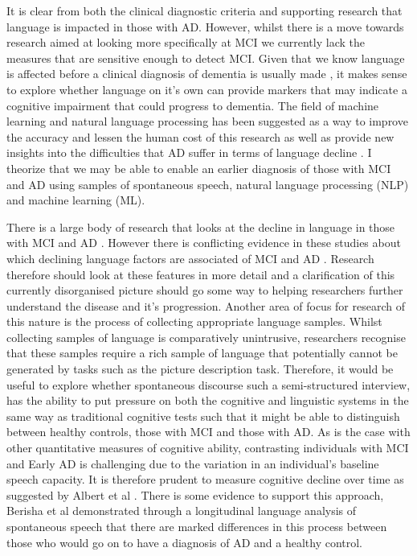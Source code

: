 \par
It is clear from both the clinical diagnostic criteria and supporting research that language is impacted in those with AD. However, whilst there is a move towards research aimed at looking more specifically at MCI we currently lack the measures that are sensitive enough to detect MCI. Given that we know language is affected before a clinical diagnosis of dementia is usually made \cite{Berisha2015, Snowdon1996, Le2011}, it makes sense to explore whether language on it's own can provide markers that may indicate a cognitive impairment that could progress to dementia. The field of machine learning and natural language processing has been suggested as a way to improve the accuracy and lessen the human cost of this research as well as provide new insights into the difficulties that AD suffer in terms of language decline \cite{Boschi2017}. I theorize that we may be able to enable an earlier diagnosis of those with MCI and AD using samples of spontaneous speech, natural language processing (NLP) and machine learning (ML).
\par
There is a large body of research that looks at the decline in language in those with MCI and AD \cite{Taler2008, Boschi2017}. However there is conflicting evidence in these studies about which declining language factors are associated of MCI and AD \cite{Taler2008, Boschi2017}. Research therefore should look at these features in more detail and a clarification of this currently disorganised picture should go some way to helping researchers further understand the disease and it's progression. Another area of focus for research of this nature is the process of collecting appropriate language samples. Whilst collecting samples of language is comparatively unintrusive, researchers recognise that these samples require a rich sample of language that potentially cannot be generated by tasks such as the picture description task. Therefore, it would be useful to explore whether spontaneous discourse such a semi-structured interview, has the ability to put pressure on both the cognitive and linguistic systems in the same way as traditional cognitive tests such that it might be able to distinguish between healthy controls, those with MCI and those with AD. As is the case with other quantitative measures of cognitive ability, contrasting individuals with MCI and Early AD is challenging due to the variation in an individual's baseline speech capacity. It is therefore prudent to measure cognitive decline over time as suggested by Albert et al \cite{Albert2011}. There is some evidence to support this approach, Berisha et al \cite{Berisha2015} demonstrated through a longitudinal language analysis of spontaneous speech that there are marked differences in this process between those who would go on to have a diagnosis of AD and a healthy control. 
